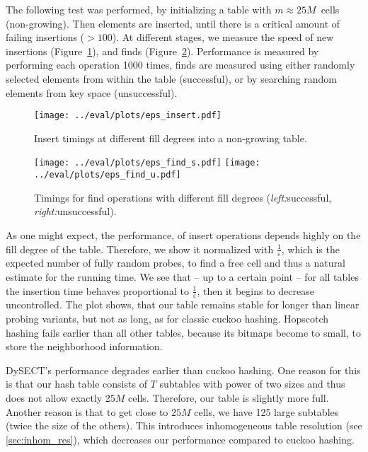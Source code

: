 \documentclass[a4paper,UKenglish]{lipics-v2016}
\begin{document}
The following test was performed, by initializing a table with
$m\approx25M$~cells (non-growing). Then elements are inserted, until there
is a critical amount of failing insertions ($>100$).  At different
stages, we measure the speed of new insertions
(Figure~\ref{fig:eps_insert}), and finds (Figure~\ref{fig:eps_find}).
Performance is measured by performing each operation 1000 times, finds
are measured using either randomly selected elements from within the table (successful), or by
searching random elements from key space (unsuccessful).

\begin{figure}[ht]
  \centering
  \texttt{[image: ../eval/plots/eps\_insert.pdf]}
  \caption{\label{fig:eps_insert}Insert timings at different fill
    degrees into a non-growing table.}
\end{figure}
\begin{figure}[ht]
  \centering
  \texttt{[image: ../eval/plots/eps\_find\_s.pdf]}
  \texttt{[image: ../eval/plots/eps\_find\_u.pdf]}
  \caption{Timings for find operations with different fill degrees
    (\emph{left:}successful, \emph{right:}unsuccessful).}
  \label{fig:eps_find}
\end{figure}

As one might expect, the performance, of insert operations depends
highly on the fill degree of the table.  Therefore, we show it
normalized with $\frac{1}{\varepsilon}$, which is the expected number
of fully random probes, to find a free cell and thus a natural
estimate for the running time. We see that -- up to a certain point --
for all tables the insertion time behaves proportional to
$\frac{1}{\varepsilon}$, then it begins to decrease uncontrolled.  The
plot shows, that our table remains stable for longer than linear
probing variants, but not as long, as for classic cuckoo hashing.
Hopscotch hashing fails earlier than all other tables, because its
bitmaps become to small, to store the neighborhood information.

DySECT's performance degrades earlier than cuckoo hashing.  One reason
for this is that our hash table consists of $T$ subtables with power
of two sizes and thus does not allow exactly $25M$ cells.  Therefore,
our table is slightly more full.  Another reason is that to get close
to $25M$ cells, we have 125 large subtables (twice the size of
the others).  This introduces inhomogeneous table resolution (see
\ref{sec:inhom_res}), which decreases our performance compared to
cuckoo hashing.
\end{document}
